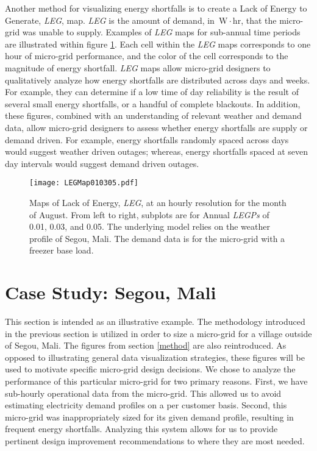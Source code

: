 \documentclass{article}
\newcommand{\unit}[1]{\ensuremath{\, \mathrm{#1}}}
\begin{document}
Another method for visualizing energy shortfalls is to create a Lack of Energy to Generate, \emph{LEG}, map. 
\emph{LEG} is the amount of demand, in \unit{W\! \cdot \! hr}, that the micro-grid was unable to supply.
Examples of \emph{LEG} maps for sub-annual time periods are illustrated within figure \ref{LEGMaps}.
Each cell within the \emph{LEG} maps corresponds to one hour of micro-grid performance, and the color of the cell corresponds to the magnitude of energy shortfall. 
\emph{LEG} maps allow micro-grid designers to qualitatively analyze how energy shortfalls are distributed across days and weeks.
For example, they can determine if a low time of day reliability is the result of several small energy shortfalls, or a handful of complete blackouts. 
In addition, these figures, combined with an understanding of relevant weather and demand data, allow micro-grid designers to assess whether energy shortfalls are supply or demand driven. 
For example, energy shortfalls randomly spaced across days would suggest weather driven outages; whereas, energy shortfalls spaced at seven day intervals would suggest demand driven outages. 


\begin{figure}[ht] 
  \centering
    \texttt{[image: LEGMap010305.pdf]}
  \caption{Maps of Lack of Energy, \emph{LEG}, at an hourly resolution for the month of August.
   From left to right, subplots are for Annual \emph{LEGPs} of 0.01, 0.03, and 0.05. 
  The underlying model relies on the weather profile of Segou, Mali.
  The demand data is for the micro-grid with a freezer base load.}
\label{LEGMaps}
\end{figure}

\section{Case Study: Segou, Mali} \label{CaseStudy}


This section is intended as an illustrative example.
The methodology introduced in the previous section is utilized in order to size a micro-grid for a village outside of Segou, Mali.
The figures from section \ref{method} are also reintroduced.
As opposed to illustrating general data visualization strategies, these figures will be used to motivate specific micro-grid design decisions.
We chose to analyze the performance of this particular micro-grid for two primary reasons.
First, we have sub-hourly operational data from the micro-grid. 
This allowed us to avoid estimating electricity demand profiles on a per customer basis.  
Second, this micro-grid was inappropriately sized for its given demand profile, resulting in frequent energy shortfalls.
Analyzing this system allows for us to provide pertinent design improvement recommendations to where they are most needed. 
\end{document}
